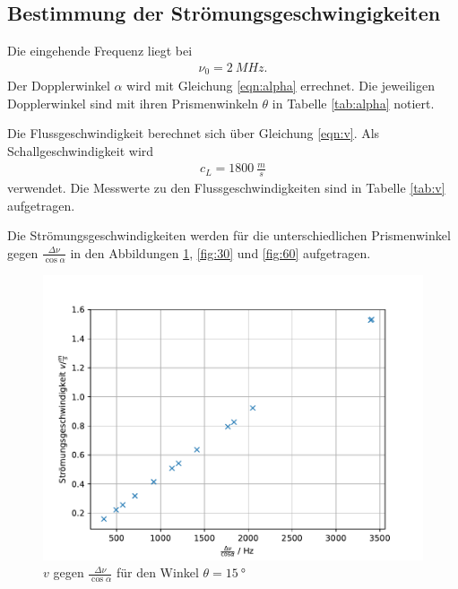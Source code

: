 \subsection{Bestimmung der Strömungsgeschwingigkeiten}

Die eingehende Frequenz liegt bei
\begin{align*}
  \nu_{\text{0}}=\SI{2}{MHz}.
\end{align*}
Der Dopplerwinkel $\alpha$ wird mit Gleichung \eqref{eqn:alpha} errechnet.
Die jeweiligen Dopplerwinkel sind mit ihren Prismenwinkeln $\theta$ in Tabelle \ref{tab:alpha} notiert.

Die Flussgeschwindigkeit berechnet sich über Gleichung \eqref{eqn:v}.
Als Schallgeschwindigkeit wird
\begin{align*}
  c_L=\SI{1800}{\frac{m}{s}}
\end{align*}
verwendet.
Die Messwerte zu den Flussgeschwindigkeiten sind in Tabelle \ref{tab:v} aufgetragen.

Die Strömungsgeschwindigkeiten werden für die unterschiedlichen Prismenwinkel gegen $\frac{\Delta \nu}{\cos{\alpha}}$ in den Abbildungen \ref{fig:15}, \ref{fig:30} und \ref{fig:60} aufgetragen.
\begin{figure}[h!]
  \centering
  \includegraphics[width=\textwidth]{15geschw.pdf}
  \caption{$v$ gegen $\frac{\Delta \nu}{\cos{\alpha}}$ für den Winkel $\theta=\SI{15}{°}$}
  \label{fig:15}
\end{figure}
